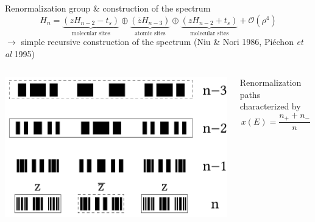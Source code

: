 \documentclass[xcolor=x11names,compress,professionalfonts]{beamer}
\renewcommand{\(}{\begin{columns}}
\renewcommand{\)}{\end{columns}}
\newcommand{\<}[1]{\begin{column}{#1}}
\renewcommand{\>}{\end{column}}
\newcommand{\zb}{\ensuremath{\overline{z}}}
\begin{document}
\begin{frame}{Renormalization group \& construction of the spectrum}
 \[ H_n = \underbrace{\left( z H_{n-2} - t_s \right)}_{\text{molecular sites}} \oplus \underbrace{\left( \zb H_{n-3} \right)}_{\text{atomic sites}} \oplus \underbrace{\left( z H_{n-2} + t_s \right)}_{\text{molecular sites}} + \mathcal{O}(\rho^4)\]
	$\rightarrow$ simple recursive construction of the spectrum (Niu \& Nori 1986, Piéchon \emph{et al} 1995)
	
	\begin{columns}
	\begin{column}{6cm}
	\centering
	\includegraphics[scale=.45]{recursive_construction_spectrum.pdf}
	\end{column}
	\begin{column}{6cm}
	
	Renormalization paths characterized by
	\[ x(E) = \frac{n_+ + n_-}{n} \]
	\end{column}
	\end{columns}
\end{frame}
\end{document}
